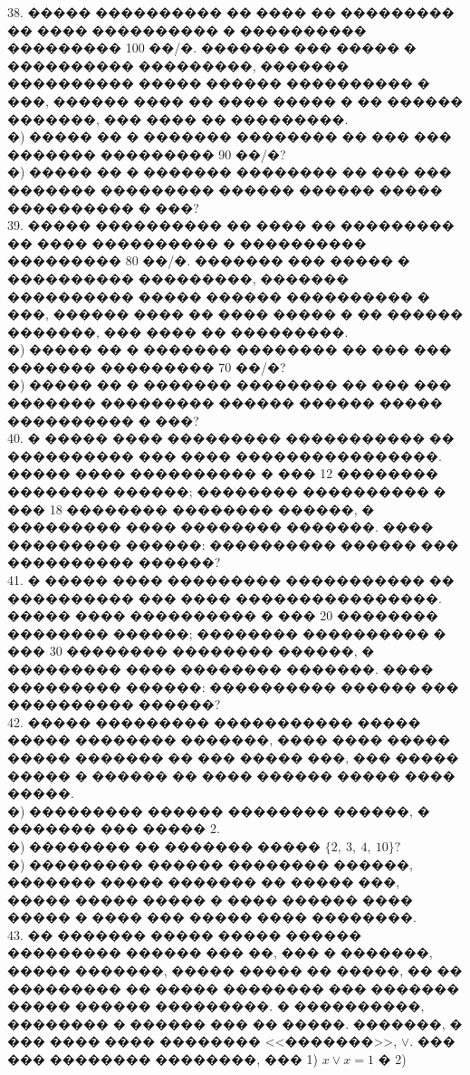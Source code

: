 \documentclass[12pt]{article}
\begin{document}
38. ����� ���������� �� ���� �� ��������� �� ���� ���������� � ���������� ��������� 100 ��/�. ������� ��� ����� � ���������� ���������, ������� ���������� ����� ������ ���������� � ���, ������ ���� �� ���� ����� � �� ������ �������, ��� ���� �� ���������.\\
�) ����� �� � ������� �������� �� ��� ��� ������� ��������� 90 ��/�?\\
�) ����� �� � ������� �������� �� ��� ��� ������� ��������� ������ ������ ����� ���������� � ���?\\
39. ����� ���������� �� ���� �� ��������� �� ���� ���������� � ���������� ��������� 80 ��/�. ������� ��� ����� � ���������� ���������, ������� ���������� ����� ������ ���������� � ���, ������ ���� �� ���� ����� � �� ������ �������, ��� ���� �� ���������.\\
�) ����� �� � ������� �������� �� ��� ��� ������� ��������� 70 ��/�?\\
�) ����� �� � ������� �������� �� ��� ��� ������� ��������� ������ ������ ����� ���������� � ���?\\
40. � ����� ���� ��������� ����������� �� ���������� ��� ���� ����������������. ����� ���� ���������� � ��� 12 �������� �������� ������; �������� ���������� � ��� 18 �������� �������� ������, � ��������� ���� �������� �������. ���� ��������� ������: ���������� ������ ��� ���������� ������?\\
41. � ����� ���� ��������� ����������� �� ���������� ��� ���� ����������������. ����� ���� ���������� � ��� 20 �������� �������� ������; �������� ���������� � ��� 30 �������� �������� ������, � ��������� ���� �������� �������. ���� ��������� ������: ���������� ������ ��� ���������� ������?\\
42. ����� ��������� ����������� ����� ����� �������� �������, ���� ���� ����� ����� ������� �� ��� ����� ���, ��� ����� ����� � ������ �� ���� ������ ����� ���� �����.\\
�) ��������� ������ �������� ������, � ������� ��� ����� 2.\\
�) �������� �� ������� ����� $\{2,\ 3,\ 4,\ 10\}?$\\
�) ��������� ������ �������� ������, ������� ����� ������� �� ����� ���, ����� ����� ����� � ���� ������ ���� ����� � ���� ��� ����� ���� ��������.\\
43. �� ������� ����� ����� ������ ��������� ������ ��� ��, ��� � �������, ����� �������, ����� ����� �� �����, �� �� ��������� �� ����� �������� ��� ������� ����� ������ ���������. � ����������, �������� � ������ ��� �� �����. �������, � ��� ���� ���� �������� <<�������>>, $\vee.$ ��� ��� �������� ��������, ��� 1) $x\vee x=1$ � 2)
\end{document}
